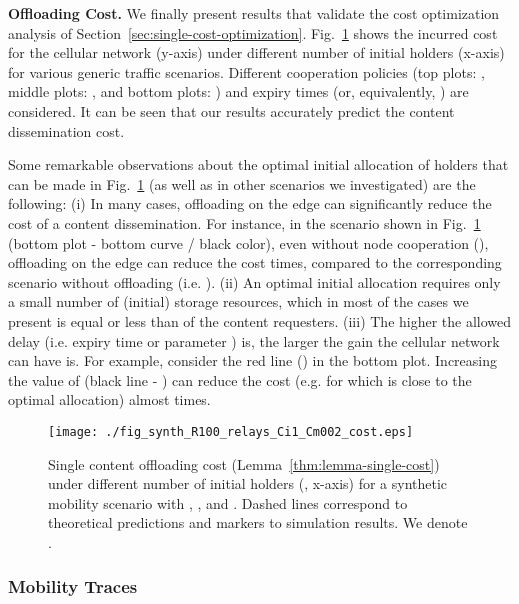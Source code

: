 \documentclass[10pt,conference,letterpaper]{IEEEtran}
\begin{document}
\textbf{Offloading Cost.} We finally present results that validate the cost optimization analysis of Section~\ref{sec:single-cost-optimization}. Fig.~\ref{fig:cost-single-synthetic} shows the incurred cost for the cellular network (y-axis) under different number of initial holders  (x-axis) for various generic traffic scenarios. Different cooperation policies (top plots: , middle plots: , and bottom plots: ) and expiry times  (or, equivalently, ) are considered. It can be seen that our results accurately predict the content dissemination cost.

Some remarkable observations about the optimal initial allocation of holders that can be made in Fig.~\ref{fig:cost-single-synthetic} (as well as in other scenarios we investigated) are the following: (i) In many cases, offloading on the edge can significantly reduce the cost of a content dissemination. For instance, in the scenario shown in Fig.~\ref{fig:cost-single-synthetic} (bottom plot - bottom curve / black color), even without node cooperation (), offloading on the edge can reduce the cost  times, compared to the corresponding scenario without offloading (i.e. ). (ii) An optimal initial allocation requires only a small number of (initial) storage resources, which in most of the cases we present is equal or less than  of the content requesters. (iii) The higher the allowed delay (i.e. expiry time  or parameter ) is, the larger the gain the cellular network can have is. For example, consider the red line () in the bottom plot. Increasing  the value of  (black line - ) can reduce the cost (e.g. for  which is close to the optimal allocation) almost  times.


\begin{figure}
\centering
{\texttt{[image: ./fig\_synth\_R100\_relays\_Ci1\_Cm002\_cost.eps]}\label{fig:cost-single-synth}}
\caption{Single content offloading cost  (Lemma~\ref{thm:lemma-single-cost}) under different number of initial holders (, x-axis) for a synthetic mobility scenario with , , and . Dashed lines correspond to theoretical predictions and markers to simulation results. We denote .}
\label{fig:cost-single-synthetic}
\end{figure}





\subsubsection{Mobility Traces}
\end{document}
